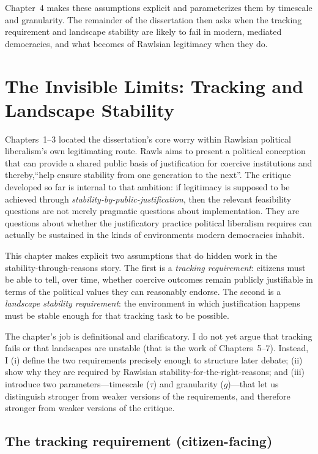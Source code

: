 \documentclass[12pt]{report}
\begin{document}
Chapter~4 makes these assumptions explicit and parameterizes them by timescale and granularity. The remainder of the dissertation then asks when the tracking requirement and landscape stability are likely to fail in modern, mediated democracies, and what becomes of Rawlsian legitimacy when they do.

\chapter{The Invisible Limits: Tracking and Landscape Stability}

Chapters~1--3 located the dissertation’s core worry within Rawlsian political liberalism’s own legitimating route. Rawls aims to present a political conception that can provide a shared public basis of justification for coercive institutions and thereby,\enquote {help ensure stability from one generation to the next}.\parencite[p.~1]{rawls1987overlapping} The critique developed so far is internal to that ambition: if legitimacy is supposed to be achieved through \emph{stability-by-public-justification}, then the relevant feasibility questions are not merely pragmatic questions about implementation. They are questions about whether the justificatory practice political liberalism requires can actually be sustained in the kinds of environments modern democracies inhabit.

This chapter makes explicit two assumptions that do hidden work in the stability-through-reasons story. The first is a \emph{tracking requirement}: citizens must be able to tell, over time, whether coercive outcomes remain publicly justifiable in terms of the political values they can reasonably endorse. The second is a \emph{landscape stability requirement}: the environment in which justification happens must be stable enough for that tracking task to be possible.

The chapter’s job is definitional and clarificatory. I do not yet argue that tracking fails or that landscapes are unstable (that is the work of Chapters~5--7). Instead, I (i) define the two requirements precisely enough to structure later debate; (ii) show why they are required by Rawlsian stability-for-the-right-reasons; and (iii) introduce two parameters---timescale (\(\tau\)) and granularity (\(g\))---that let us distinguish stronger from weaker versions of the requirements, and therefore stronger from weaker versions of the critique.

\section{The tracking requirement (citizen-facing)}\label{sec:tracking}
\end{document}
